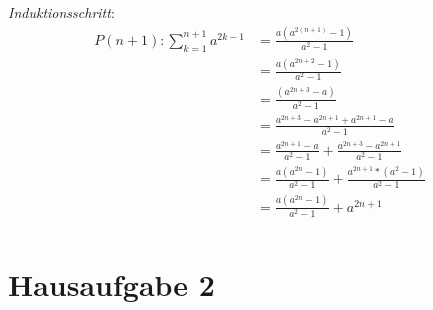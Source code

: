 \documentclass{article}
\begin{document}
\begin{enumerate}[a)]
  \emph{Induktionsschritt}:
  \begin{align*}
    P(n + 1) \colon \sum\limits_{k = 1}^{n + 1} a^{2k - 1} &= \frac{a(a^{2(n + 1)} - 1)}{a^2 - 1}  \\
                                                           &= \frac{a(a^{2n + 2} - 1)}{a^2 - 1}  \\
                                                           &= \frac{(a^{2n + 3} - a)}{a^2 - 1}  \\   
                                                           &= \frac{a^{2n + 3} - a^{2n + 1} + a^{2n + 1} - a}{a^2 - 1} \\
                                                           &= \frac{a^{2n + 1} - a}{a^2 - 1} + \frac{a^{2n + 3} - a^{2n + 1}}{a^2 - 1}  \\
                                                           &= \frac{a(a^{2n} - 1)}{a^2 - 1} + \frac{a^{2n + 1} * (a^2 - 1)}{a^2 - 1}  \\
                                                           &= \frac{a(a^{2n} - 1)}{a^2 - 1} + a^{2n + 1}  \\
  \end{align*}
\end{enumerate}

\newpage
\section*{Hausaufgabe 2}
\end{document}
